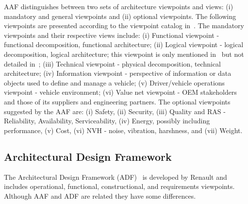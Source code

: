  AAF distinguishes between two sets of architecture viewpoints and views: (i) mandatory and general viewpoints and (ii) optional viewpoints. The following viewpoints are presented according to the viewpoint catalog in~\cite{RozWooBook}.
The mandatory viewpoints and their respective views include: (i)
%
Functional viewpoint - functional decomposition, functional
architecture;
(ii) Logical viewpoint - logical decomposition, logical architecture; this viewpoint is only mentioned in~\cite{Broy} but not detailed in~\cite{TUM-I0915};
(iii) Technical viewpoint - physical decomposition, technical architecture;
(iv) Information viewpoint - perspective of information or data objects used to
define and manage a vehicle;
(v) Driver/vehicle operations viewpoint - vehicle environment;
(vi) Value net viewpoint - OEM stakeholders and those of its suppliers and engineering partners. 
The optional viewpoints suggested by the AAF are:
(i) Safety, (ii) Security, (iii) Quality and RAS - Reliability, Availability, Serviceability, (iv) Energy, possibly including performance, (v) Cost, (vi) NVH - noise, vibration, harshness, and (vii) Weight.

\subsection{Architectural Design Framework}

The Architectural Design Framework (ADF)~\cite{AFRenault} is developed by Renault %
and 
includes operational, functional, constructional, and requirements viewpoints. Although
 AAF and ADF are related they have some differences. 

